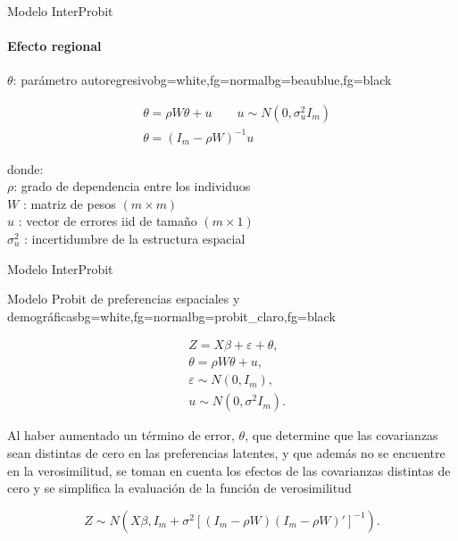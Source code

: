 \setwatermark{\fontsize{50pt}{50pt}\selectfont{\textcolor{frenchblue}{dependencia}}}
\begin{frame}{Modelo InterProbit}
\framesubtitle{Efecto regional}

\begin{variableblock}{$\theta$: parámetro autoregresivo}{bg=white,fg=normal}{bg=beaublue,fg=black}

\begin{align}
& \theta = \rho W\theta + u \qquad  u \sim N(0,\sigma_{u}^2I_m ) \nonumber \\ 
& \theta = \left(I_m -\rho W \right)^{-1}u \nonumber
\end{align}

donde:\\
$\rho$: grado de dependencia entre los individuos \\
$W$ : matriz de pesos $(m \times m)$\\
$u$ : vector de errores iid de tamaño $(m \times 1)$\\
$\sigma^2_u$ : incertidumbre de la estructura espacial
\end{variableblock}

\end{frame}
\setwatermark{\fontsize{50pt}{50pt}\selectfont{ }}
\begin{frame}{Modelo InterProbit}

\begin{variableblock}{Modelo Probit de preferencias espaciales y demográficas}{bg=white,fg=normal}{bg=probit_claro,fg=black}

\begin{align}
& Z = X\beta +\varepsilon + \theta,  \nonumber \\
& \theta = \rho W \theta + u,  \nonumber \\
& \varepsilon \sim N(0,I_m), \nonumber \\
& u \sim N(0,\sigma^{2}I_m). \nonumber
\end{align}
\end{variableblock}

Al haber aumentado un término de error, $\theta$,  que determine que las covarianzas sean distintas de cero en las preferencias latentes, y que además no se encuentre en la verosimilitud, se toman en cuenta los efectos de las covarianzas distintas de cero  y se simplifica la evaluación de la función de verosimilitud

\[
Z \sim N \left(X\beta, I_m + \sigma^2 \left[\left(I_m-\rho W\right) \left(I_m-\rho W\right)' \right]^{-1} \right). \]


\end{frame}

